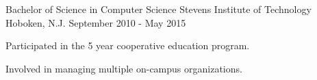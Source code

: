 

\begin{cventries}

  \cventry
    {Bachelor of Science in Computer Science} %
    {Stevens Institute of Technology} %
    {Hoboken, N.J.} %
    {September 2010 - May 2015} %
    {
      \begin{cvitems} %
        \item {Participated in the 5 year cooperative education program.}
        \item {Involved in managing multiple on-campus organizations.}
      \end{cvitems}
    }

\end{cventries}
